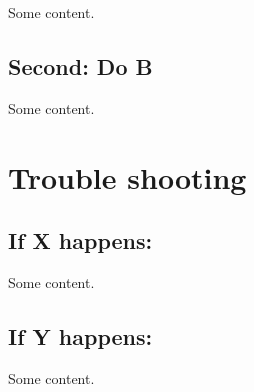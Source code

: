 \documentclass{article}
\begin{document}
Some content.


\subsection*{Second: Do B}\label{caseB}

Some content.


\section*{Trouble shooting}\label{trbl-shoot}

\subsection*{If X happens:}\label{caseX}

Some content.


\subsection*{If Y happens:}\label{caseY}

Some content.
\end{document}
